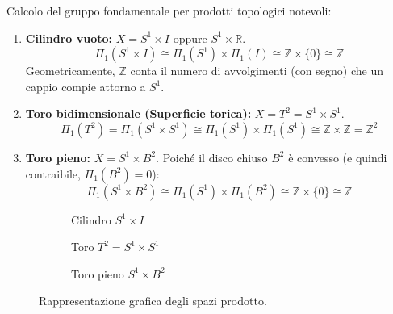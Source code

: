 \begin{ejemplo}
Calcolo del gruppo fondamentale per prodotti topologici notevoli:

\begin{enumerate}
    \item \textbf{Cilindro vuoto:} $X = S^1 \times I$ oppure $S^1 \times \mathbb{R}$.
    \[
    \Pi_1(S^1 \times I) \cong \Pi_1(S^1) \times \Pi_1(I) \cong \mathbb{Z} \times \{0\} \cong \mathbb{Z}
    \]
    Geometricamente, $\mathbb{Z}$ conta il numero di avvolgimenti (con segno) che un cappio compie attorno a $S^1$.

    \item \textbf{Toro bidimensionale (Superficie torica):} $X = T^2 = S^1 \times S^1$.
    \[
    \Pi_1(T^2) = \Pi_1(S^1 \times S^1) \cong \Pi_1(S^1) \times \Pi_1(S^1) \cong \mathbb{Z} \times \mathbb{Z} = \mathbb{Z}^2
    \]

    \item \textbf{Toro pieno:} $X = S^1 \times B^2$.
    Poiché il disco chiuso $B^2$ è convesso (e quindi contraibile, $\Pi_1(B^2) = 0$):
    \[
    \Pi_1(S^1 \times B^2) \cong \Pi_1(S^1) \times \Pi_1(B^2) \cong \mathbb{Z} \times \{0\} \cong \mathbb{Z}
    \]
\end{enumerate}

\begin{figure}[H]
    \centering
    \begin{subfigure}[b]{0.3\textwidth}
        \centering
        \caption{Cilindro $S^1 \times I$}
    \end{subfigure}
    \hfill
    \begin{subfigure}[b]{0.3\textwidth}
        \centering
        \caption{Toro $T^2 = S^1 \times S^1$}
    \end{subfigure}
    \hfill
    \begin{subfigure}[b]{0.3\textwidth}
        \centering
        \caption{Toro pieno $S^1 \times B^2$}
    \end{subfigure}
    \caption{Rappresentazione grafica degli spazi prodotto.}
\end{figure}
\end{ejemplo}

